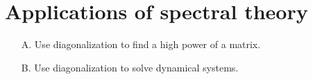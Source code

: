 \section{Applications of spectral theory}

\begin{outcome}
\begin{enumerate}
\item[A.] Use diagonalization to find a high power of a matrix.

\item[B.] Use diagonalization to solve dynamical systems.
\end{enumerate}
\end{outcome}
